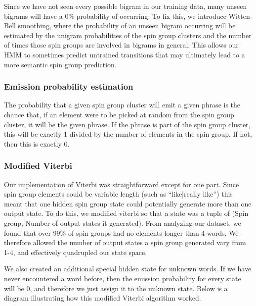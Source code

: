 \documentclass[11pt,letterpaper,oneside, titlepage]{scrartcl}
\begin{document}
Since we have not seen every possible bigram in our training data, many unseen bigrams will have a 0\% probability of occurring. To fix this, we introduce Witten-Bell smoothing, where the probability of an unseen bigram occurring will be estimated by the unigram probabilities of the spin group clusters and the number of times those spin groups are involved in bigrams in general. This allows our HMM to sometimes predict untrained transitions that may ultimately lead to a more semantic spin group prediction.

\subsubsection{Emission probability estimation}

The probability that a given spin group cluster will emit a given phrase is the chance that, if an element were to be picked at random from the spin group cluster, it will be the given phrase. If the phrase is part of the spin group cluster, this will be exactly 1 divided by the number of elements in the spin group. If not, then this is exactly 0.

\subsubsection{Modified Viterbi}

Our implementation of Viterbi was straightforward except for one part. Since spin group elements could be variable length (such as “{like|really like}”) this meant that one hidden spin group state could potentially generate more than one output state. To do this, we modified viterbi so that a state was a tuple of (Spin group, Number of output states it generated). From analyzing our dataset, we found that over 99\% of spin groups had no elements longer than 4 words. We therefore allowed the number of output states a spin group generated vary from 1-4, and effectively quadrupled our state space. 

We also created an additional special hidden state for unknown words. If we have never encountered a word before, then the emission probability for every state will be 0, and therefore we just assign it to the unknown state. Below is a diagram illustrating how this modified Viterbi algorithm worked.
\end{document}

